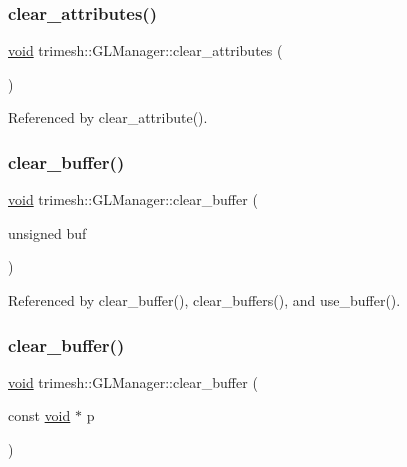 \subsubsection{\texorpdfstring{clear\+\_\+attributes()}{clear\_attributes()}}
{\footnotesize\ttfamily \hyperlink{namespacetrimesh_a784ddfd979e1c579bda795a8edfc3f43}{void} trimesh\+::\+G\+L\+Manager\+::clear\+\_\+attributes (\begin{DoxyParamCaption}{ }\end{DoxyParamCaption})}



Referenced by clear\+\_\+attribute().

\mbox{\label{classtrimesh_1_1GLManager_a70984a41840187556a53bc9d947a70fc}} 
\subsubsection{\texorpdfstring{clear\+\_\+buffer()}{clear\_buffer()}\hspace{0.1cm}{\footnotesize\ttfamily [1/3]}}
{\footnotesize\ttfamily \hyperlink{namespacetrimesh_a784ddfd979e1c579bda795a8edfc3f43}{void} trimesh\+::\+G\+L\+Manager\+::clear\+\_\+buffer (\begin{DoxyParamCaption}\item[{unsigned}]{buf }\end{DoxyParamCaption})}



Referenced by clear\+\_\+buffer(), clear\+\_\+buffers(), and use\+\_\+buffer().

\mbox{\label{classtrimesh_1_1GLManager_a6ad60a5c139d59ae95c5838a1d0dc632}} 
\subsubsection{\texorpdfstring{clear\+\_\+buffer()}{clear\_buffer()}\hspace{0.1cm}{\footnotesize\ttfamily [2/3]}}
{\footnotesize\ttfamily \hyperlink{namespacetrimesh_a784ddfd979e1c579bda795a8edfc3f43}{void} trimesh\+::\+G\+L\+Manager\+::clear\+\_\+buffer (\begin{DoxyParamCaption}\item[{const \hyperlink{namespacetrimesh_a784ddfd979e1c579bda795a8edfc3f43}{void} $\ast$}]{p }\end{DoxyParamCaption})\hspace{0.3cm}{\ttfamily [inline]}}

